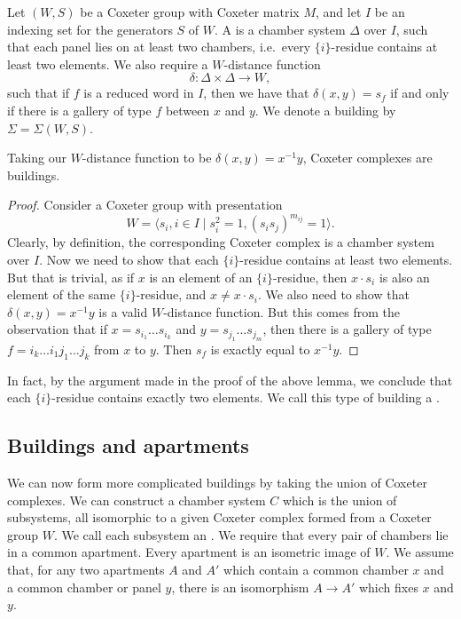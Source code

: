 \documentclass[11pt]{article}
\begin{document}
\begin{definition}
    Let $(W,S)$ be a Coxeter group with Coxeter matrix $M$, and let $I$ be an indexing set for the generators $S$ of $W$. A  is a chamber system $\Delta$ over $I$, such that each panel lies on at least two chambers, i.e.\ every $\{i\}$-residue contains at least two elements. We also require a $W$-distance function
    \[\delta:\Delta\times \Delta \to W,\]
    such that if $f$ is a reduced word in $I$, then we have that $\delta(x,y)=s_f$ if and only if there is a gallery of type $f$ between $x$ and $y$. We denote a building by $\Sigma=\Sigma(W,S)$. 
\end{definition}

\begin{lemma}\label{cox}
    Taking our $W$-distance function to be $\delta(x,y)=x^{-1}y$, Coxeter complexes are buildings.
\end{lemma}

\begin{proof}
    Consider a Coxeter group with presentation
    \[W=\langle s_i,i\in I\mid s_i^2=1,(s_is_j)^{m_{ij}}=1\rangle.\]
    Clearly, by definition, the corresponding Coxeter complex is a chamber system over $I$. Now we need to show that each $\{i\}$-residue contains at least two elements. But that is trivial, as if $x$ is an element of an $\{i\}$-residue, then $x\cdot s_i$ is also an element of the same $\{i\}$-residue, and $x\neq x\cdot s_i$. 
    We also need to show that $\delta(x,y)=x^{-1}y$ is a valid $W$-distance function. But this comes from the observation that if $x=s_{i_1}\hdots  s_{i_k}$ and $y=s_{j_1}\hdots  s_{j_m}$, then there is a gallery of type $f=i_k\hdots  i_1j_1\hdots  j_k$ from $x$ to $y$. Then $s_f$ is exactly equal to $x^{-1}y$. 
\end{proof}

In fact, by the argument made in the proof of the above lemma, we conclude that each $\{i\}$-residue contains exactly two elements. We call this type of building a .


\subsection{Buildings and apartments}\label{apartments}
We can now form more complicated buildings by taking the union of Coxeter complexes. We can construct a chamber system $C$ which is the union of subsystems, all isomorphic to a given Coxeter complex formed from a Coxeter group $W$. We call each subsystem an . We require that every pair of chambers lie in a common apartment. Every apartment is an isometric image of $W$. We assume that, for any two apartments $A$ and $A'$ which contain a common chamber $x$ and a common chamber or panel $y$, there is an isomorphism $A\to A'$ which fixes $x$ and $y$.  
\end{document}
